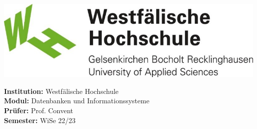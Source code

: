 \begin{titlepage}
    \clearpage
    \maketitle
    \vspace{2cm}
    \begin{center}
        \includegraphics[width=\paperwidth/2]{assets/img/whs}
    \end{center}
    \vspace*{\fill}
    \begin{flushleft}
        \Large{\textbf{Institution:} Westfälische Hochschule}\\
        \Large{\textbf{Modul:} Datenbanken und Informationssysteme} \\
        \Large{\textbf{Prüfer:} Prof. Convent}\\
        \Large{\textbf{Semester:} WiSe 22/23}
    \end{flushleft}
\end{titlepage}
